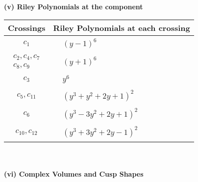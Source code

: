 \documentclass[1p]{elsarticle_modified}
\theoremstyle{definition}
\begin{document}
\newpage\renewcommand{\arraystretch}{1}
\flushleft \textbf{(v) Riley Polynomials at the component}\newline \\
\begin{tabular}{m{50pt}|m{274pt}}
Crossings & \hspace{64pt}Riley Polynomials at each crossing \\
\hline $$\begin{aligned}c_{1}\end{aligned}$$&$\begin{aligned}
&(y-1)^6
\end{aligned}$\\
\hline $$\begin{aligned}c_{2},c_{4},c_{7}\\c_{8},c_{9}\end{aligned}$$&$\begin{aligned}
&(y+1)^6
\end{aligned}$\\
\hline $$\begin{aligned}c_{3}\end{aligned}$$&$\begin{aligned}
&y^6
\end{aligned}$\\
\hline $$\begin{aligned}c_{5},c_{11}\end{aligned}$$&$\begin{aligned}
&(y^3+y^2+2 y+1)^2
\end{aligned}$\\
\hline $$\begin{aligned}c_{6}\end{aligned}$$&$\begin{aligned}
&(y^3-3 y^2+2 y+1)^2
\end{aligned}$\\
\hline $$\begin{aligned}c_{10},c_{12}\end{aligned}$$&$\begin{aligned}
&(y^3+3 y^2+2 y-1)^2
\end{aligned}$\\
\hline
\end{tabular}\\~\\
\newpage\flushleft \textbf{(vi) Complex Volumes and Cusp Shapes}
\end{document}
